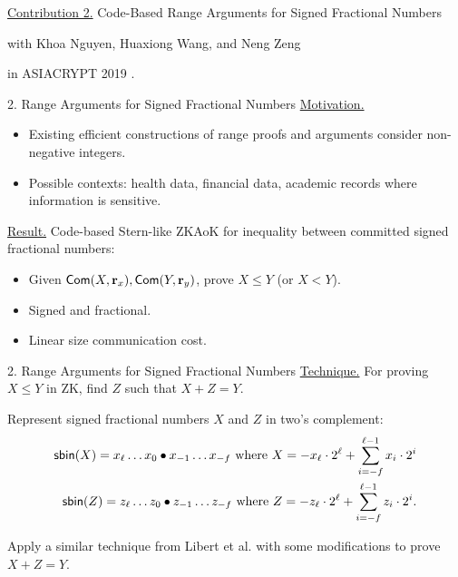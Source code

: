 \begin{frame}
	\underline{Contribution 2.} Code-Based Range Arguments for Signed Fractional Numbers
	
	{\small with Khoa Nguyen, Huaxiong Wang, and Neng Zeng}
	
	in ASIACRYPT 2019 \cite{NguyenTWZ19}.
\end{frame}

\begin{frame}{2. Range Arguments for Signed Fractional Numbers}
	\underline{Motivation.} \pause
	\begin{itemize}
		\item Existing efficient constructions of range proofs and arguments consider non-negative integers.\pause
		\item Possible contexts: health data, financial data, academic records where information is sensitive.\pause
	\end{itemize}

	\underline{Result.} Code-based Stern-like ZKAoK for inequality between committed signed fractional numbers:\pause
	\begin{itemize}
		\item Given $\mathsf{Com }(X, \mathbf{r}_x), \mathsf{Com }(Y, \mathbf{r}_y)$, prove $X \leq Y$ (or $X < Y$).\pause 
		\item Signed and fractional.\pause
		\item Linear size communication cost.
	\end{itemize}
	
\end{frame}

\begin{frame}{2. Range Arguments for Signed Fractional Numbers}
	\underline{Technique.} For proving $X \leq Y$ in ZK, find $Z$ such that $X + Z = Y$.\pause
	
	Represent signed fractional numbers $X$ and $Z$ in two's complement:\pause
	\begin{align*}
		\mathsf{sbin}(X) = x_\ell \dots x_0\bullet x_{-1}\dots x_{-f} \text{ where } X = -x_\ell \cdot 2^{\ell} + \sum_{i = -f}^{\ell-1} x_i\cdot 2^i\\ 
		\mathsf{sbin}(Z) = z_\ell \dots z_0\bullet z_{-1}\dots z_{-f} \text{ where } Z = -z_\ell \cdot 2^{\ell} + \sum_{i = -f}^{\ell-1} z_i\cdot 2^i.
	\end{align*}\pause

	Apply a similar technique from Libert et al. \cite{LibertLNW18} with some modifications to prove $X + Z = Y$.
\end{frame}